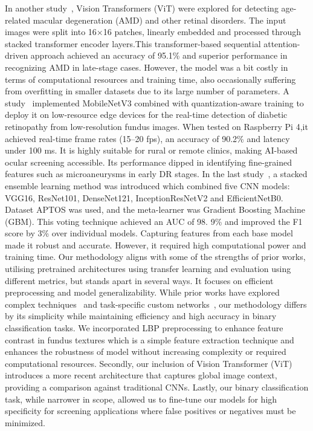 \documentclass{ijclclp}
\begin{document}
\newline
\newline
In another study~\cite{xu2023automatic}, Vision Transformers (ViT) were explored for detecting age-related macular degeneration (AMD) and other retinal disorders. The input images were split into 16×16 patches, linearly embedded and processed through stacked transformer encoder layers.This transformer-based sequential attention-driven approach achieved an accuracy of 95.1\% and  superior performance in recognizing AMD in late-stage cases. However, the model was a bit costly in terms of computational resources and training time, also occasionally suffering from overfitting in smaller datasets due to its large number of parameters. A study~\cite{prajapati2023retinal} implemented MobileNetV3 combined with quantization-aware training to deploy it on low-resource edge devices for the real-time detection of diabetic retinopathy from low-resolution fundus images. When tested on Raspberry Pi 4,it achieved real-time frame rates (15–20 fps), an accuracy of 90.2\% and latency under 100 ms. It is highly suitable for rural or remote clinics, making AI-based ocular screening accessible. Its performance dipped in identifying fine-grained features such as microaneurysms in early DR stages.
\newline
\newline
In the last study~\cite{patel2022spatial}, a stacked ensemble learning method was introduced which combined five CNN models: VGG16, ResNet101, DenseNet121, InceptionResNetV2 and EfficientNetB0. Dataset APTOS was used, and the meta-learner was Gradient Boosting Machine (GBM). This voting technique achieved an AUC of 98. 9\% and improved the F1 score by 3\% over individual models. Capturing features from each base model made it robust and accurate. However, it required high computational power and training time.
\newline
\newline
Our methodology aligns with some of the strengths of prior works, utilising pretrained architectures using transfer learning and evaluation using different metrics, but stands apart in several ways. It focuses on efficient preprocessing and model generalizability. While prior works have explored complex techniques~\cite{guergueb2021ocular} and task-specific custom networks~\cite{ye2024ocular}, our methodology differs by its simplicity while maintaining efficiency and high accuracy in binary classification tasks. We incorporated LBP preprocessing to enhance feature contrast in fundus textures which is a simple feature extraction technique and enhances the robustness of model without increasing complexity or required computational resources. Secondly, our inclusion of Vision Transformer (ViT) introduces a more recent architecture that captures global image context, providing a comparison against traditional CNNs. Lastly, our binary classification task, while narrower in scope, allowed us to fine-tune our models for high specificity for screening applications where false positives or negatives must be minimized. 
\end{document}
